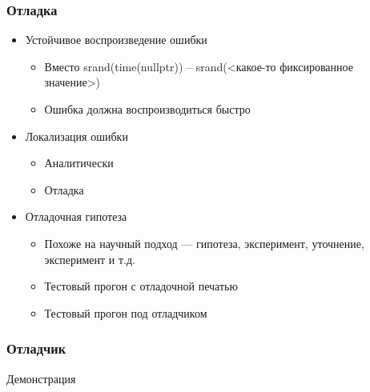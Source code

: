 \documentclass{../../slides-style}
\begin{document}
    \begin{frame}
        \frametitle{Отладка}
        \begin{itemize}
            \item Устойчивое воспроизведение ошибки
            \begin{itemize}
                \item Вместо srand(time(nullptr)) – srand(<какое-то фиксированное значение>)
                \item Ошибка должна воспроизводиться быстро
            \end{itemize}
            \item Локализация ошибки
            \begin{itemize}
                \item Аналитически
                \item Отладка
            \end{itemize}
            \item Отладочная гипотеза
            \begin{itemize}
                \item Похоже на научный подход --- гипотеза, эксперимент, уточнение, эксперимент и т.д.
                \item Тестовый прогон с отладочной печатью
                \item Тестовый прогон под отладчиком
            \end{itemize}
        \end{itemize}
    \end{frame}

    \begin{frame}
        \frametitle{Отладчик}
        \begin{Large}
            \begin{center}
                Демонстрация
            \end{center}
        \end{Large}
    \end{frame}
\end{document}
